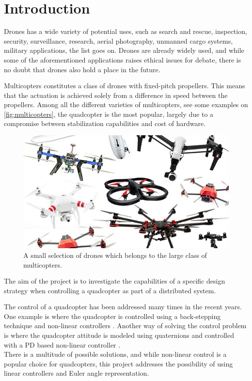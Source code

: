 \chapter{Introduction}\label{chap:Introduction}
Drones has a wide variety of potential uses, such as search and rescue, inspection, security, surveillance, research, aerial photography, unmanned cargo systems, military applications, the list goes on. Drones are already widely used, and while some of the aforementioned applications raises ethical issues for debate, there is no doubt that drones also hold a place in the future.

Multicopters constitutes a class of drones with fixed-pitch propellers. This means that the actuation is achieved solely from a difference in speed between the propellers. Among all the different varieties of multicopters, see some examples on \autoref{fig:multicopters}, the quadcopter is the most popular, largely due to a compromise between stabilization capabilities and cost of hardware. \cite{TypesOfMulticopter}

\begin{figure}[H]
  \centering
  \includegraphics[width=.6\linewidth]{figures/multicopters}
  \caption{A small selection of drones which belongs to the large class of multicopters. \cite{multiCopterPhoto}}
  \label{fig:multicopters}
\end{figure}

The aim of the project is to investigate the capabilities of a specific design strategy when controlling a quadcopter as part of a distributed system.

The control of a quadcopter has been addressed many times in the recent years. One example is where the quadcopter is controlled using a back-stepping technique and non-linear controllers \cite{backstepping}. Another way of solving the control problem is where the quadcopter attitude is modeled using quaternions and controlled with a PD based non-linear controller \cite{quaternionsPD}.\\
There is a multitude of possible solutions, and while non-linear control is a popular choice for quadcopters, this project addresses the possibility of using linear controllers and Euler angle representation.

